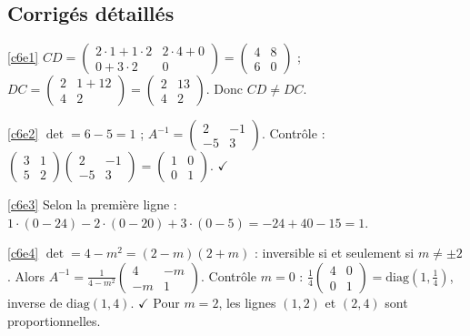 \ifcorr
\subsection{Corrigés détaillés}
\begin{corrige}{\ref{c6e1}}
$CD=\begin{pmatrix}2\cdot1+1\cdot2&2\cdot4+0\\0+3\cdot2&0\end{pmatrix}=\begin{pmatrix}4&8\\6&0\end{pmatrix}$ ; $DC=\begin{pmatrix}2&1+12\\4&2\end{pmatrix}=\begin{pmatrix}2&13\\4&2\end{pmatrix}$. Donc $CD\ne DC$.
\end{corrige}
\begin{corrige}{\ref{c6e2}}
$\det=6-5=1$ ; $A^{-1}=\begin{pmatrix}2&-1\\-5&3\end{pmatrix}$. Contrôle : $\begin{pmatrix}3&1\\5&2\end{pmatrix}\begin{pmatrix}2&-1\\-5&3\end{pmatrix}=\begin{pmatrix}1&0\\0&1\end{pmatrix}$. $\checkmark$
\end{corrige}
\begin{corrige}{\ref{c6e3}}
Selon la première ligne : $1\cdot(0-24)-2\cdot(0-20)+3\cdot(0-5)=-24+40-15=1$.
\end{corrige}
\begin{corrige}{\ref{c6e4}}
$\det=4-m^2=(2-m)(2+m)$ : inversible si et seulement si $m\ne\pm2$. Alors $A^{-1}=\frac1{4-m^2}\begin{pmatrix}4&-m\\-m&1\end{pmatrix}$. Contrôle $m=0$ : $\frac14\begin{pmatrix}4&0\\0&1\end{pmatrix}=\mathrm{diag}(1,\frac14)$, inverse de $\mathrm{diag}(1,4)$. $\checkmark$ Pour $m=2$, les lignes $(1,2)$ et $(2,4)$ sont proportionnelles.
\end{corrige}
